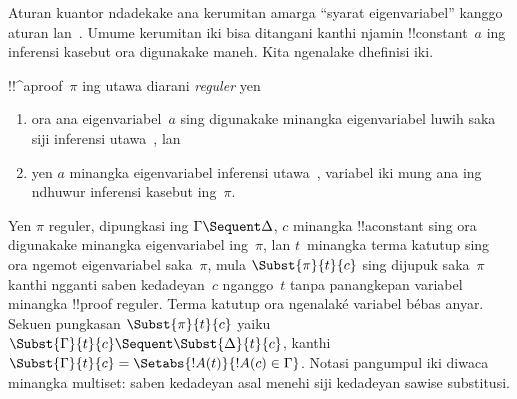 \documentclass[../../../include/open-logic-section]{subfiles}
\begin{document}


Aturan kuantor ndadekake ana kerumitan amarga ``syarat
eigenvariabel'' kanggo aturan \LeftR{\lexists} lan~\RightR{\lforall}.
Umume kerumitan iki bisa ditangani kanthi njamin
!!{constant}~$a$ ing inferensi kasebut ora digunakake maneh.
Kita ngenalake dhefinisi iki.

\begin{defn}
!!^a{proof}~$\pi$ ing  utawa  diarani
\emph{reguler} yen
\begin{enumerate}
  \item ora ana eigenvariabel~$a$ sing digunakake minangka
  eigenvariabel luwih saka siji inferensi
  \LeftR{\lexists} utawa~\RightR{\lforall}, lan
  \item yen $a$ minangka eigenvariabel inferensi
  \LeftR{\lexists} utawa~\RightR{\lforall}, variabel iki
  mung ana ing ndhuwur inferensi kasebut ing~$\pi$.
\end{enumerate}
\end{defn}

\begin{lem}
Yen $\pi$ reguler, dipungkasi ing $\Gamma \Sequent \Delta$,
$c$ minangka !!a{constant} sing ora digunakake minangka
eigenvariabel ing~$\pi$, lan $t$~minangka terma katutup sing ora
ngemot eigenvariabel saka~$\pi$, mula $\Subst{\pi}{t}{c}$
sing dijupuk saka~$\pi$ kanthi ngganti saben kedadeyan~$c$
nganggo~$t$ tanpa panangkepan variabel minangka !!{proof} reguler.
Terma katutup ora ngenalaké variabel bébas anyar. Sekuen pungkasan
$\Subst{\pi}{t}{c}$ yaiku $\Subst{\Gamma}{t}{c} \Sequent
\Subst{\Delta}{t}{c}$, kanthi $\Subst{\Gamma}{t}{c} =
\Setabs{!A(t)}{!A(c) \in \Gamma}$. Notasi pangumpul iki
diwaca minangka multiset: saben kedadeyan asal menehi
siji kedadeyan sawise substitusi.
\end{lem}
\end{document}
